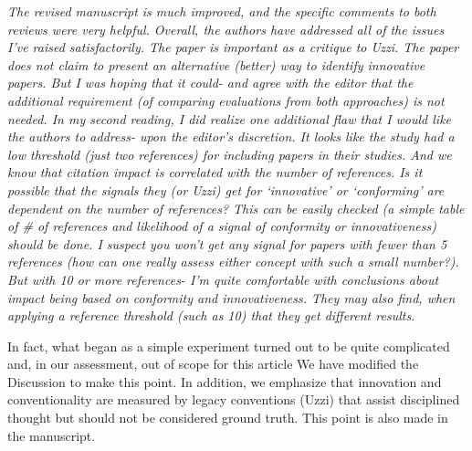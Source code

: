 \documentclass[11pt, oneside]{article}   	%
\begin{document}
\emph{The revised manuscript is much improved, and the specific comments to both reviews were very helpful. Overall, the authors have addressed all of the issues I’ve raised satisfactorily. The paper is important as a critique to Uzzi. The paper does not claim to present an alternative (better) way to identify innovative papers.  But I was hoping that it could- and agree with the editor that the additional requirement (of comparing evaluations from both approaches) is not needed. In my second reading, I did realize one additional flaw that I would like the authors to address- upon the editor’s discretion.  It looks like the study had a low threshold (just two references) for including papers in their studies. And we know that citation impact is correlated with the number of references. Is it possible that the signals they (or Uzzi) get for ‘innovative’ or ‘conforming’ are dependent on the number of references? This can be easily checked (a simple table of \# of references and likelihood of a signal of conformity or innovativeness) should be done. I suspect you won’t get any signal for papers with fewer than 5 references (how can one really assess either concept with such a small number?).  But with 10 or more references- I'm quite comfortable with conclusions about impact being based on conformity and innovativeness. They may also find, when applying a reference threshold (such as 10) that they get different results.}

In fact, what began as a simple experiment turned out to be quite complicated and, in our assessment, out of scope for this article  We have modified the Discussion to make this point. In addition, we emphasize that innovation and conventionality are measured by legacy conventions (Uzzi) that assist disciplined thought but should not be considered ground truth. This point is also made in the manuscript.
\end{document}
